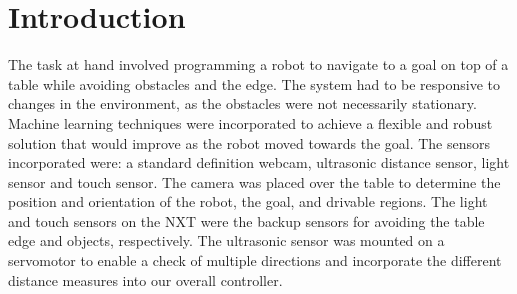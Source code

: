\section{Introduction}
\label{section::introduction}

The task at hand involved programming a robot to navigate to a goal on top of a table while avoiding obstacles and the edge. The system had to be responsive to changes in the environment, as the obstacles were not necessarily stationary. Machine learning techniques\cite{ttml} were incorporated to achieve a flexible and robust solution that would improve as the robot moved towards the goal. The sensors incorporated were: a standard definition webcam, ultrasonic distance sensor, light sensor and touch sensor. The camera was placed over the table to determine the position and orientation of the robot, the goal, and drivable regions. The light and touch sensors on the NXT were the backup sensors for avoiding the table edge and objects, respectively. The ultrasonic sensor was mounted on a servomotor to enable a check of multiple directions and incorporate the different distance measures into our overall controller.
